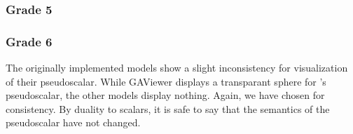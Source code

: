 \subsubsection{Grade 5}


\subsubsection{Grade 6}
The originally implemented models show a slight inconsistency for visualization of their pseudoscalar.  While GAViewer displays a transparant sphere for \ega{}'s pseudoscalar, the other models display nothing.  Again, we have chosen for consistency.  By duality to scalars, it is safe to say that the semantics of the pseudoscalar have not changed.
